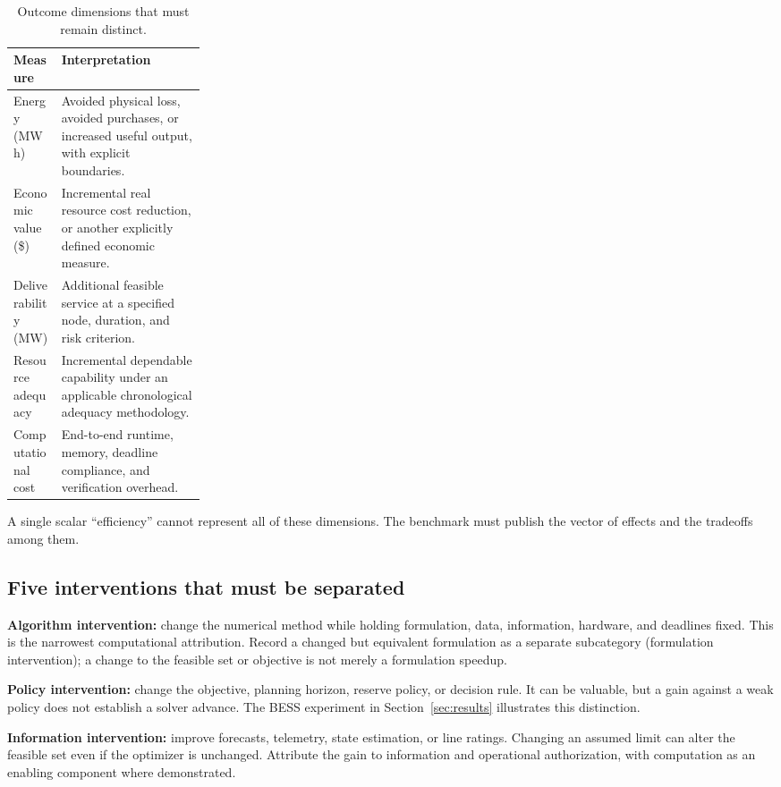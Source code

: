 \documentclass[11pt,letterpaper]{article}
\begin{document}
\begin{table}[htbp]
\centering\small
\caption{Outcome dimensions that must remain distinct.}
\begin{tabularx}{\linewidth}{p{0.25\linewidth}Y}
\toprule
Measure & Interpretation\\
\midrule
Energy (MWh) & Avoided physical loss, avoided purchases, or increased useful output, with explicit boundaries.\\
Economic value (\$) & Incremental real resource cost reduction, or another explicitly defined economic measure.\\
Deliverability (MW) & Additional feasible service at a specified node, duration, and risk criterion.\\
Resource adequacy & Incremental dependable capability under an applicable chronological adequacy methodology.\\
Computational cost & End-to-end runtime, memory, deadline compliance, and verification overhead.\\
\bottomrule
\end{tabularx}
\end{table}
A single scalar ``efficiency'' cannot represent all of these dimensions. The benchmark must publish the vector of effects and the tradeoffs among them.

\subsection{Five interventions that must be separated}
\textbf{Algorithm intervention:} change the numerical method while holding formulation, data, information, hardware, and deadlines fixed. This is the narrowest computational attribution. Record a changed but equivalent formulation as a separate subcategory (formulation intervention); a change to the feasible set or objective is not merely a formulation speedup.

\textbf{Policy intervention:} change the objective, planning horizon, reserve policy, or decision rule. It can be valuable, but a gain against a weak policy does not establish a solver advance. The BESS experiment in Section~\ref{sec:results} illustrates this distinction.

\textbf{Information intervention:} improve forecasts, telemetry, state estimation, or line ratings. Changing an assumed limit can alter the feasible set even if the optimizer is unchanged. Attribute the gain to information and operational authorization, with computation as an enabling component where demonstrated.
\end{document}
